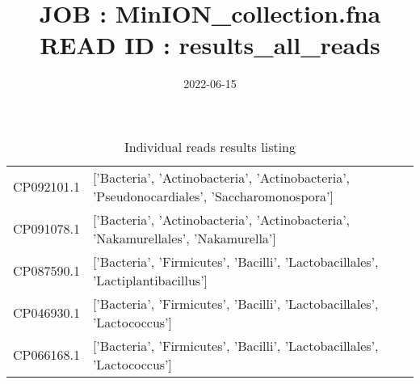 \documentclass[12pt]{article}
\title{JOB : MinION\_collection.fna\\[0.2em]\smaller{}READ ID : results\_all\_reads}
\date{2022-06-15}
\begin{document}
\maketitle
\begin{table}[htp]
\begin{tabular}{ll}
CP092101.1 & ['Bacteria', 'Actinobacteria', 'Actinobacteria', 'Pseudonocardiales', 'Saccharomonospora'] \\
CP091078.1 & ['Bacteria', 'Actinobacteria', 'Actinobacteria', 'Nakamurellales', 'Nakamurella'] \\
CP087590.1 & ['Bacteria', 'Firmicutes', 'Bacilli', 'Lactobacillales', 'Lactiplantibacillus'] \\
CP046930.1 & ['Bacteria', 'Firmicutes', 'Bacilli', 'Lactobacillales', 'Lactococcus'] \\
CP066168.1 & ['Bacteria', 'Firmicutes', 'Bacilli', 'Lactobacillales', 'Lactococcus']
\end{tabular}
\caption*{Individual reads results listing}
\end{table}
\end{document}
